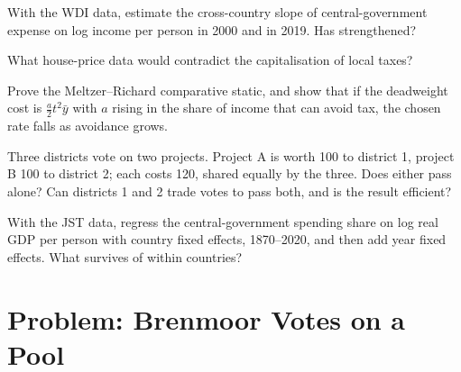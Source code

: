 \begin{exercise}[$\star\star$]\label{exo:b3:public-choice-voting:8}
With the WDI data, estimate the cross-country slope of central-government expense
on log income per person in 2000 and in 2019. Has  strengthened?
\end{exercise}

\begin{exercise}[$\star\star$]\label{exo:b3:public-choice-voting:9}
What house-price data would contradict the capitalisation of local taxes?
\end{exercise}

\begin{exercise}[$\star\star\star$]\label{exo:b3:public-choice-voting:10}
Prove the Meltzer--Richard comparative static, and show that if the deadweight cost
is $\tfrac a2t^2\bar y$ with $a$ rising in the share of income that can avoid tax, the chosen rate falls as
avoidance grows.
\end{exercise}

\begin{exercise}[$\star\star\star$]\label{exo:b3:public-choice-voting:11}
Three districts vote on two projects. Project A is worth 100 to district 1, project B
100 to district 2; each costs 120, shared equally by the three. Does either pass
alone? Can districts 1 and 2 trade votes to pass both, and is the result efficient?
\end{exercise}

\begin{exercise}[$\star\star\star$]\label{exo:b3:public-choice-voting:12}
With the JST data, regress the central-government spending share on log real GDP
per person with country fixed effects, 1870--2020, and then add year fixed effects.
What survives of  within countries?
\end{exercise}

\section{Problem: Brenmoor Votes on a Pool}\label{sec:b3:public-choice-voting:problem}

